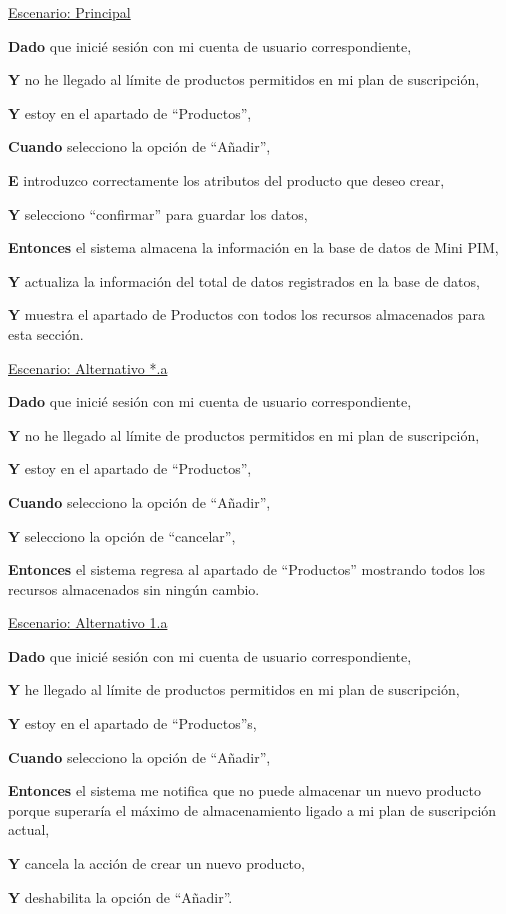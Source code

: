 \underline{Escenario: Principal}\par
\vspace{0.15cm}
\textbf{Dado} que inicié sesión con mi cuenta de usuario correspondiente,\par
\textbf{Y} no he llegado al límite de productos permitidos en mi plan de suscripción,\par
\textbf{Y} estoy en el apartado de \enquote{Productos},\par
\textbf{Cuando} selecciono la opción de \enquote{Añadir},\par
\textbf{E} introduzco correctamente los atributos del producto que deseo crear,\par
\textbf{Y} selecciono \enquote{confirmar} para guardar los datos,\par
\textbf{Entonces} el sistema almacena la información en la base de datos de Mini PIM,\par
\textbf{Y} actualiza la información del total de datos registrados en la base de datos,\par
\textbf{Y} muestra el apartado de Productos con todos los recursos almacenados para esta sección.\par
\vspace{0.20cm}

\underline{Escenario: Alternativo *.a}\par
\vspace{0.15cm}
\textbf{Dado} que inicié sesión con mi cuenta de usuario correspondiente,\par
\textbf{Y} no he llegado al límite de productos permitidos en mi plan de suscripción,\par
\textbf{Y} estoy en el apartado de \enquote{Productos},\par
\textbf{Cuando} selecciono la opción de \enquote{Añadir},\par
\textbf{Y} selecciono la opción de \enquote{cancelar},\par
\textbf{Entonces} el sistema regresa al apartado de \enquote{Productos} mostrando todos los recursos almacenados sin ningún cambio.\par
\vspace{0.20cm}

\underline{Escenario: Alternativo 1.a}\par
\vspace{0.15cm}
\textbf{Dado} que inicié sesión con mi cuenta de usuario correspondiente,\par
\textbf{Y} he llegado al límite de productos permitidos en mi plan de suscripción,\par
\textbf{Y} estoy en el apartado de \enquote{Productos}s,\par
\textbf{Cuando} selecciono la opción de \enquote{Añadir},\par
\textbf{Entonces} el sistema me notifica que no puede almacenar un nuevo producto porque superaría el máximo de almacenamiento ligado a mi plan de suscripción actual,\par
\textbf{Y} cancela la acción de crear un nuevo producto,\par
\textbf{Y} deshabilita la opción de \enquote{Añadir}.
\vspace{0.20cm}

